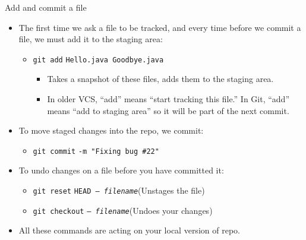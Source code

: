 \documentclass[aspectratio=169,11pt,t]{beamer}
\newcommand{\cmd}[1]{\textcolor{cmdcol}{\texttt{#1}}}    %
\newcommand{\ph}[1]{\textit{#1}}                         %
\begin{document}
\begin{frame}{Add and commit a file}
  \small
  \begin{itemize}
    \item The first time we ask a file to be tracked, and every time before we commit a file,
          we must add it to the staging area:
      \begin{itemize}
        \item \cmd{git add} \texttt{Hello.java Goodbye.java}
          \begin{itemize}
            \item Takes a snapshot of these files, adds them to the staging area.
            \item In older VCS, ``add'' means ``start tracking this file.'' In Git, ``add'' means
                  ``add to staging area'' so it will be part of the next commit.
          \end{itemize}
      \end{itemize}
    \item To move staged changes into the repo, we commit:
      \begin{itemize}
        \item \cmd{git commit} \texttt{-m "Fixing bug \#22"}
      \end{itemize}
    \item To undo changes on a file before you have committed it:
      \begin{itemize}
        \item \cmd{git reset} \texttt{HEAD -- \ph{filename}}\quad (Unstages the file)
        \item \cmd{git checkout} \texttt{-- \ph{filename}}\quad (Undoes your changes)
      \end{itemize}
    \item[--] All these commands are acting on your local version of repo.
  \end{itemize}
\end{frame}
\end{document}
